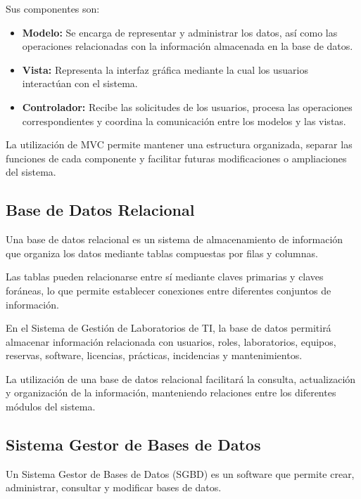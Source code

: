 Sus componentes son:

\begin{itemize}

    \item \textbf{Modelo:} Se encarga de representar y administrar los datos, así como las operaciones relacionadas con la información almacenada en la base de datos.

    \item \textbf{Vista:} Representa la interfaz gráfica mediante la cual los usuarios interactúan con el sistema.

    \item \textbf{Controlador:} Recibe las solicitudes de los usuarios, procesa las operaciones correspondientes y coordina la comunicación entre los modelos y las vistas.

\end{itemize}

La utilización de MVC permite mantener una estructura organizada, separar las funciones de cada componente y facilitar futuras modificaciones o ampliaciones del sistema.

\subsection{Base de Datos Relacional}

Una base de datos relacional es un sistema de almacenamiento de información que organiza los datos mediante tablas compuestas por filas y columnas.

Las tablas pueden relacionarse entre sí mediante claves primarias y claves foráneas, lo que permite establecer conexiones entre diferentes conjuntos de información.

En el Sistema de Gestión de Laboratorios de TI, la base de datos permitirá almacenar información relacionada con usuarios, roles, laboratorios, equipos, reservas, software, licencias, prácticas, incidencias y mantenimientos.

La utilización de una base de datos relacional facilitará la consulta, actualización y organización de la información, manteniendo relaciones entre los diferentes módulos del sistema.

\subsection{Sistema Gestor de Bases de Datos}

Un Sistema Gestor de Bases de Datos (SGBD) es un software que permite crear, administrar, consultar y modificar bases de datos.

